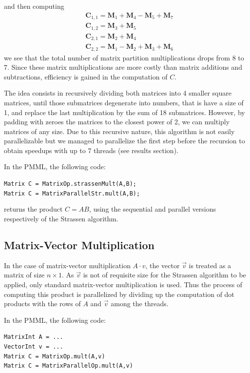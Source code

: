 \documentclass{dependencies/acm_proc_article-sp}
\begin{document}
and then computing 
\begin{align*}
&\mathbf{C}_{1,1} = \mathbf{M}_{1} + \mathbf{M}_{4} - \mathbf{M}_{5} + \mathbf{M}_{7}\\
&\mathbf{C}_{1,2} = \mathbf{M}_{3} + \mathbf{M}_{5}\\
&\mathbf{C}_{2,1} = \mathbf{M}_{2} + \mathbf{M}_{4}\\
&\mathbf{C}_{2,2} = \mathbf{M}_{1} - \mathbf{M}_{2} + \mathbf{M}_{3} + \mathbf{M}_{6}
\end{align*}
we see that the total number of matrix partition multiplications drops from $8$ to $7$. Since these matrix multiplications are more costly than matrix additions and subtractions, efficiency is gained in the computation of $C$.

The idea consists in recursively dividing both matrices into 4 smaller square matrices, until those submatrices degenerate into numbers, that is have a size of 1, and replace the last multiplication by the sum of 18 submatrices. However, by padding with zeroes the matrices to the closest power of 2, we can multiply matrices of any size. Due to this recursive nature, this algorithm is not easily parallelizable but we managed to parallelize the first step before the recursion to obtain speedups with up to 7 threads (see results section).

In the PMML, the following code:

{\tt Matrix C = MatrixOp.strassenMult(A,B);\\
Matrix C = MatrixParallelStr.mult(A,B);}

returns the product $C=AB$, using the sequential and parallel versions respectively of the Strassen algorithm. 

\subsection{Matrix-Vector Multiplication}

In the case of matrix-vector multiplication $A\cdot v$, the vector $\vec{v}$ is treated as a matrix of size $n\times 1$. As $\vec{v}$ is not of requisite size for the Strassen algorithm to be applied, only standard matrix-vector multiplication is used. Thus the process of computing this product is parallelized by dividing up the computation of dot products with the rows of $A$ and $\vec{v}$ among the threads.

In the PMML, the following code:

{\tt MatrixInt A = ...\\
VectorInt v = ... \\
Matrix C = MatrixOp.mult(A,v) \\
Matrix C = MatrixParallelOp.mult(A,v) }
\end{document}
